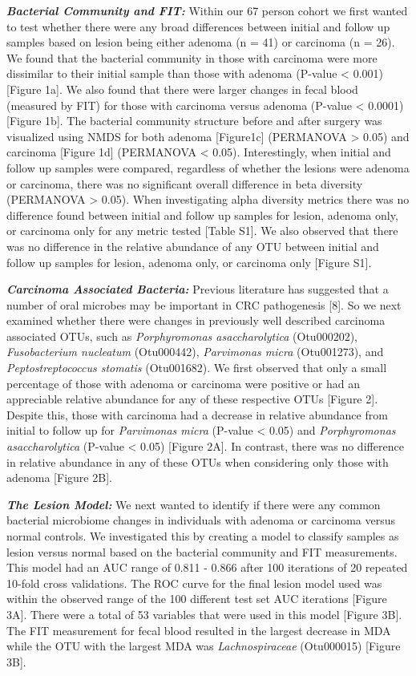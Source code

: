\documentclass[12pt,]{article}
\begin{document}
\textbf{\emph{Bacterial Community and FIT:}} Within our 67 person cohort
we first wanted to test whether there were any broad differences between
initial and follow up samples based on lesion being either adenoma (n =
41) or carcinoma (n = 26). We found that the bacterial community in
those with carcinoma were more dissimilar to their initial sample than
those with adenoma (P-value \textless{} 0.001) {[}Figure 1a{]}. We also
found that there were larger changes in fecal blood (measured by FIT)
for those with carcinoma versus adenoma (P-value \textless{} 0.0001)
{[}Figure 1b{]}. The bacterial community structure before and after
surgery was visualized using NMDS for both adenoma {[}Figure1c{]}
(PERMANOVA \textgreater{} 0.05) and carcinoma {[}Figure 1d{]} (PERMANOVA
\textless{} 0.05). Interestingly, when initial and follow up samples
were compared, regardless of whether the lesions were adenoma or
carcinoma, there was no significant overall difference in beta diversity
(PERMANOVA \textgreater{} 0.05). When investigating alpha diversity
metrics there was no difference found between initial and follow up
samples for lesion, adenoma only, or carcinoma only for any metric
tested {[}Table S1{]}. We also observed that there was no difference in
the relative abundance of any OTU between initial and follow up samples
for lesion, adenoma only, or carcinoma only {[}Figure S1{]}.

\textbf{\emph{Carcinoma Associated Bacteria:}} Previous literature has
suggested that a number of oral microbes may be important in CRC
pathogenesis {[}8{]}. So we next examined whether there were changes in
previously well described carcinoma associated OTUs, such as
\emph{Porphyromonas asaccharolytica} (Otu000202), \emph{Fusobacterium
nucleatum} (Otu000442), \emph{Parvimonas micra} (Otu001273), and
\emph{Peptostreptococcus stomatis} (Otu001682). We first observed that
only a small percentage of those with adenoma or carcinoma were positive
or had an appreciable relative abundance for any of these respective
OTUs {[}Figure 2{]}. Despite this, those with carcinoma had a decrease
in relative abundance from initial to follow up for \emph{Parvimonas
micra} (P-value \textless{} 0.05) and \emph{Porphyromonas
asaccharolytica} (P-value \textless{} 0.05) {[}Figure 2A{]}. In
contrast, there was no difference in relative abundance in any of these
OTUs when considering only those with adenoma {[}Figure 2B{]}.

\textbf{\emph{The Lesion Model:}} We next wanted to identify if there
were any common bacterial microbiome changes in individuals with adenoma
or carcinoma versus normal controls. We investigated this by creating a
model to classify samples as lesion versus normal based on the bacterial
community and FIT measurements. This model had an AUC range of 0.811 -
0.866 after 100 iterations of 20 repeated 10-fold cross validations. The
ROC curve for the final lesion model used was within the observed range
of the 100 different test set AUC iterations {[}Figure 3A{]}. There were
a total of 53 variables that were used in this model {[}Figure 3B{]}.
The FIT measurement for fecal blood resulted in the largest decrease in
MDA while the OTU with the largest MDA was \emph{Lachnospiraceae}
(Otu000015) {[}Figure 3B{]}.
\end{document}
